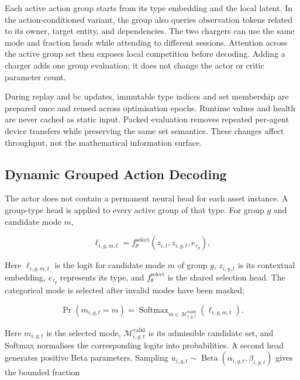 Each active action group starts from its type embedding and the local latent. In the action-conditioned variant, the group also queries observation tokens related to its owner, target entity, and dependencies. The two chargers can use the same mode and fraction heads while attending to different sessions. Attention across the active group set then exposes local competition before decoding. Adding a charger adds one group evaluation; it does not change the actor or critic parameter count.

During replay and \gls{bc} updates, immutable type indices and set membership are prepared once and reused across optimisation epochs. Runtime values and health are never cached as static input. Packed evaluation removes repeated per-agent device transfers while preserving the same set semantics. These changes affect throughput, not the mathematical information surface.

\subsection{Dynamic Grouped Action Decoding}
\label{sec:timarl-action-decoder}

The actor does not contain a permanent neural head for each asset instance. A group-type head is applied to every active group of that type. For group $g$ and candidate mode $m$,

\begin{equation}
\ell_{i,g,m,t}
=
f^{\mathrm{select}}_{\theta}
\left(
 z_{i,t},z_{i,g,t},e_{\tau_g}
\right),
\label{eq:port-logit}
\end{equation}

Here $\ell_{i,g,m,t}$ is the logit for candidate mode $m$ of group $g$, $z_{i,g,t}$ is its contextual embedding, $e_{\tau_g}$ represents its type, and $f^{\mathrm{select}}_\theta$ is the shared selection head. The categorical mode is selected after invalid modes have been masked:

\begin{equation}
\Pr
\left(
 m_{i,g,t}=m
\right)
=
\operatorname{Softmax}_{m\in\mathcal{M}^{\mathrm{valid}}_{i,g,t}}
\left(
\ell_{i,g,m,t}
\right).
\label{eq:port-selection}
\end{equation}

Here $m_{i,g,t}$ is the selected mode, $\mathcal M^{\mathrm{valid}}_{i,g,t}$ is its admissible candidate set, and Softmax normalises the corresponding logits into probabilities. A second head generates positive Beta parameters. Sampling $u_{i,g,t}\sim\operatorname{Beta}(\alpha_{i,g,t},\beta_{i,g,t})$ gives the bounded fraction

